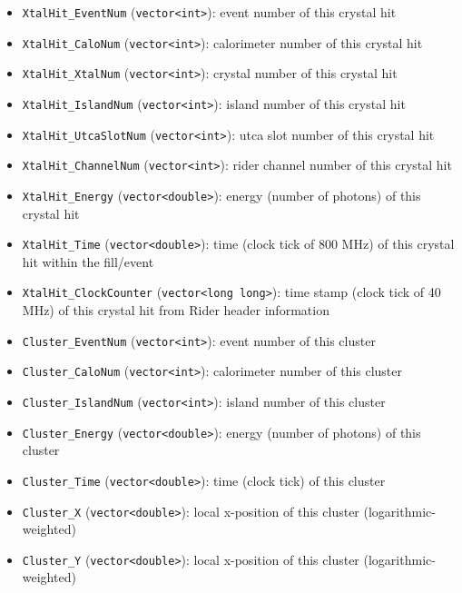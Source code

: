 \begin{itemize}
\item \verb+XtalHit_EventNum+ (\verb+vector<int>+): event number of this crystal hit
\item \verb+XtalHit_CaloNum+ (\verb+vector<int>+): calorimeter number of this crystal hit
\item \verb+XtalHit_XtalNum+ (\verb+vector<int>+): crystal number of this crystal hit
\item \verb+XtalHit_IslandNum+ (\verb+vector<int>+): island number of this crystal hit
\item \verb+XtalHit_UtcaSlotNum+ (\verb+vector<int>+): utca slot number of this crystal hit
\item \verb+XtalHit_ChannelNum+ (\verb+vector<int>+): rider channel number of this crystal hit
\item \verb+XtalHit_Energy+ (\verb+vector<double>+): energy (number of photons) of this crystal hit
\item \verb+XtalHit_Time+ (\verb+vector<double>+): time (clock tick of 800 MHz) of this crystal hit within the fill/event
\item \verb+XtalHit_ClockCounter+ (\verb+vector<long long>+): time stamp (clock tick of 40 MHz) of this crystal hit from Rider header information

\item \verb+Cluster_EventNum+ (\verb+vector<int>+): event number of this cluster 
\item \verb+Cluster_CaloNum+ (\verb+vector<int>+): calorimeter number of this cluster
\item \verb+Cluster_IslandNum+ (\verb+vector<int>+): island number of this cluster
\item \verb+Cluster_Energy+ (\verb+vector<double>+): energy (number of photons) of this cluster
\item \verb+Cluster_Time+ (\verb+vector<double>+): time (clock tick) of this cluster 
\item \verb+Cluster_X+ (\verb+vector<double>+): local x-position of this cluster (logarithmic-weighted)
\item \verb+Cluster_Y+ (\verb+vector<double>+): local x-position of this cluster (logarithmic-weighted)


\end{itemize}
